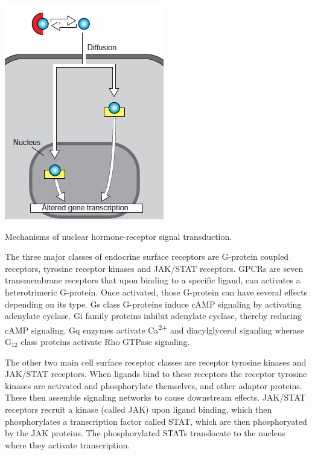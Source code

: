 \documentclass{tufte-handout}
\begin{document}
\begin{marginfigure}[-8cm]
  \includegraphics{figures/nuclear-hormone-receptors}
  \caption{Mechanisms of nuclear hormone-receptor signal transduction.}
    \label{fig:nuclear-hormone-receptors}
\end{marginfigure}

The three major classes of endocrine surface receptors are G-protein coupled receptors, tyrosine receptor kinases and JAK/STAT receptors.  GPCRs are seven transmembrane receptors that upon binding to a specific ligand, can activates a heterotrimeric G-protein.  Once activated, those G-protein can have several effects depending on its type.  Gs class G-proteins induce cAMP signaling by activating adenylate cyclase.  Gi family proteins inhibit adenylate cyclase, thereby reducing cAMP signaling.  Gq enzymes activate Ca\textsuperscript{2+} and diacylglycerol siganling wherase G$_{12}$ class proteins activate Rho GTPase signaling.

The other two main cell surface receptor classes are receptor tyrosine kinases and JAK/STAT receptors.  When ligands bind to these receptors the receptor tyrosine kinases are activated and phosphorylate themselves, and other adaptor proteins.  These then assemble signaling networks to cause downstream effects.  JAK/STAT receptors recruit a kinase (called JAK) upon ligand binding, which then phosphorylates a transcription factor called STAT, which are then phosphoryated by the JAK proteins.  The phosphorylated STATs translocate to the nucleus where they activate transcription.
\end{document}
